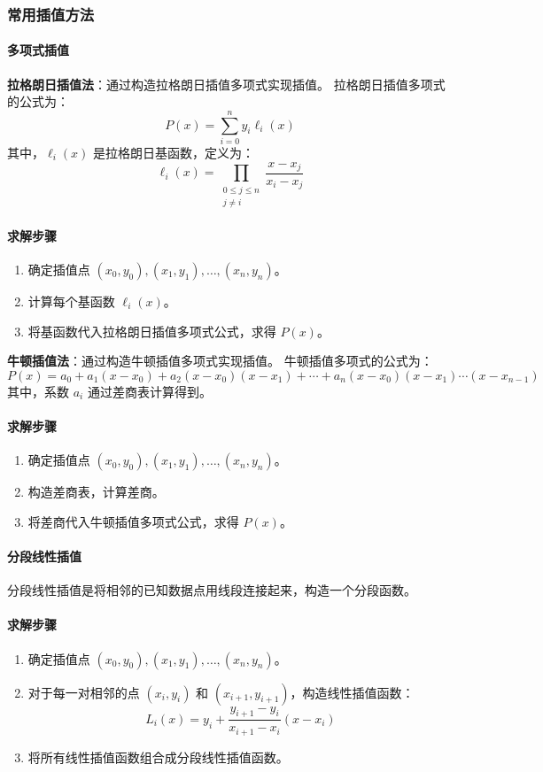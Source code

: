 \documentclass[UTF8]{ctexart}
\begin{document}
\subsubsection {常用插值方法}
\paragraph{多项式插值}
\textbf{拉格朗日插值法}：通过构造拉格朗日插值多项式实现插值。
拉格朗日插值多项式的公式为：
\[
P(x) = \sum_{i=0}^{n} y_i \ell_i(x)
\]
其中，\(\ell_i(x)\) 是拉格朗日基函数，定义为：
\[
\ell_i(x) = \prod_{\substack{0 \leq j \leq n \\ j \neq i}} \frac{x - x_j}{x_i - x_j}
\]

\paragraph{求解步骤}
\begin{enumerate}
    \item 确定插值点 \( (x_0, y_0), (x_1, y_1), \ldots, (x_n, y_n) \)。
    \item 计算每个基函数 \(\ell_i(x)\)。
    \item 将基函数代入拉格朗日插值多项式公式，求得 \(P(x)\)。
\end{enumerate}

\textbf{牛顿插值法}：通过构造牛顿插值多项式实现插值。
牛顿插值多项式的公式为：
\[
P(x) = a_0 + a_1 (x - x_0) + a_2 (x - x_0)(x - x_1) + \cdots + a_n (x - x_0)(x - x_1) \cdots (x - x_{n-1})
\]
其中，系数 \(a_i\) 通过差商表计算得到。

\paragraph{求解步骤}
\begin{enumerate}
    \item 确定插值点 \( (x_0, y_0), (x_1, y_1), \ldots, (x_n, y_n) \)。
    \item 构造差商表，计算差商。
    \item 将差商代入牛顿插值多项式公式，求得 \(P(x)\)。
\end{enumerate}

\paragraph{分段线性插值}
分段线性插值是将相邻的已知数据点用线段连接起来，构造一个分段函数。
\paragraph{求解步骤}
\begin{enumerate}
    \item 确定插值点 \( (x_0, y_0), (x_1, y_1), \ldots, (x_n, y_n) \)。
    \item 对于每一对相邻的点 \( (x_i, y_i) \) 和 \( (x_{i+1}, y_{i+1}) \)，构造线性插值函数：
    \[
    L_i(x) = y_i + \frac{y_{i+1} - y_i}{x_{i+1} - x_i} (x - x_i)
    \]
    \item 将所有线性插值函数组合成分段线性插值函数。
\end{enumerate}
\end{document}
